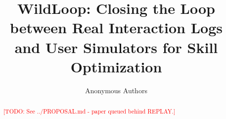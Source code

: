 \documentclass[11pt]{article}
\title{WildLoop: Closing the Loop between Real Interaction Logs\\and User Simulators for Skill Optimization}
\author{Anonymous Authors}
\date{}
\newcommand{\todo}[1]{\textcolor{red}{[TODO: #1]}}
\begin{document}
\maketitle

\begin{abstract}
\todo{See ../PROPOSAL.md - paper queued behind REPLAY.}
\end{abstract}



\end{document}
